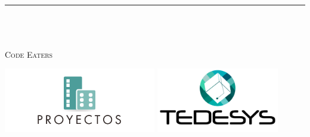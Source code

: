 \begin{titlepage} %
	
	\raggedleft %
	\textcolor{seccion}{\rule{1pt}{\textheight}} %
	\hspace{0.1\textwidth} %
	\parbox[b]{0.75\textwidth}{ %
		{\Huge \color{titulos}\bf\varProyecto\\\varTitle}\\[2\baselineskip] %
		{\large\color{seccion}\textit{\varSubTitle}}\\[4\baselineskip] %
		{\Large\textsc{Code Eaters}} %
		
		\vspace{0.25\textheight} %
		
		\includegraphics[height=80pt]{paquetes/temaImg/logoProyecto}
		\includegraphics[height=80pt]{paquetes/temaImg/logoEmpresa}	
	}
\end{titlepage}